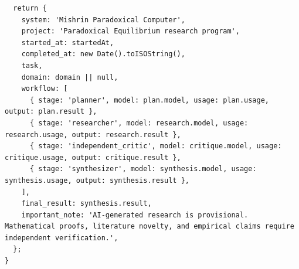 \documentclass[10pt,a4paper]{article}
\begin{document}
\begin{lstlisting}
  return {
    system: 'Mishrin Paradoxical Computer',
    project: 'Paradoxical Equilibrium research program',
    started_at: startedAt,
    completed_at: new Date().toISOString(),
    task,
    domain: domain || null,
    workflow: [
      { stage: 'planner', model: plan.model, usage: plan.usage, output: plan.result },
      { stage: 'researcher', model: research.model, usage: research.usage, output: research.result },
      { stage: 'independent_critic', model: critique.model, usage: critique.usage, output: critique.result },
      { stage: 'synthesizer', model: synthesis.model, usage: synthesis.usage, output: synthesis.result },
    ],
    final_result: synthesis.result,
    important_note: 'AI-generated research is provisional. Mathematical proofs, literature novelty, and empirical claims require independent verification.',
  };
}
\end{lstlisting}
\end{document}

